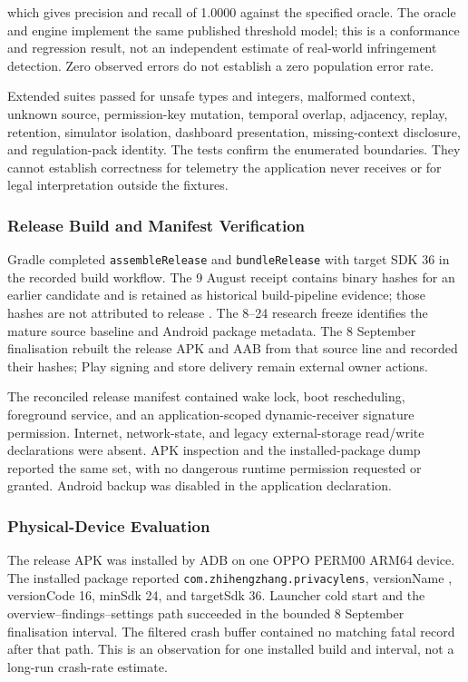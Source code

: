 which gives precision and recall of 1.0000 against the specified oracle. The oracle and engine implement the same published threshold model; this is a conformance and regression result, not an independent estimate of real-world infringement detection. Zero observed errors do not establish a zero population error rate.

Extended suites passed for unsafe types and integers, malformed context, unknown source, permission-key mutation, temporal overlap, adjacency, replay, retention, simulator isolation, dashboard presentation, missing-context disclosure, and regulation-pack identity. The tests confirm the enumerated boundaries. They cannot establish correctness for telemetry the application never receives or for legal interpretation outside the fixtures.

\subsubsection{Release Build and Manifest Verification}

Gradle completed \texttt{assembleRelease} and \texttt{bundleRelease} with target SDK 36 in the recorded build workflow. The 9 August receipt contains binary hashes for an earlier candidate and is retained as historical build-pipeline evidence; those hashes are not attributed to release \PrivacyLensVersion{}. The 8--24 research freeze identifies the mature source baseline and Android package metadata. The 8 September finalisation rebuilt the release APK and AAB from that source line and recorded their hashes; Play signing and store delivery remain external owner actions.

The reconciled release manifest contained wake lock, boot rescheduling, foreground service, and an application-scoped dynamic-receiver signature permission. Internet, network-state, and legacy external-storage read/write declarations were absent. APK inspection and the installed-package dump reported the same set, with no dangerous runtime permission requested or granted. Android backup was disabled in the application declaration.

\subsubsection{Physical-Device Evaluation}

The release APK was installed by ADB on one OPPO PERM00 ARM64 device. The installed package reported \texttt{com.zhihengzhang.privacylens}, versionName \PrivacyLensVersion{}, versionCode 16, minSdk 24, and targetSdk 36. Launcher cold start and the overview--findings--settings path succeeded in the bounded 8 September finalisation interval. The filtered crash buffer contained no matching fatal record after that path. This is an observation for one installed build and interval, not a long-run crash-rate estimate.

